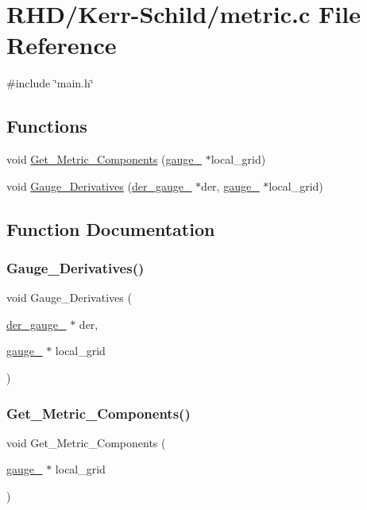 \hypertarget{Kerr-Schild_2metric_8c}{}\section{R\+H\+D/\+Kerr-\/\+Schild/metric.c File Reference}
\label{Kerr-Schild_2metric_8c}
{\ttfamily \#include \char`\"{}main.\+h\char`\"{}}\newline
\subsection*{Functions}
\begin{DoxyCompactItemize}
\item 
void \hyperlink{Kerr-Schild_2metric_8c_a18642caac9855aeac797fbaba90b64d1}{Get\+\_\+\+Metric\+\_\+\+Components} (\hyperlink{structgauge__}{gauge\+\_\+} $\ast$local\+\_\+grid)
\item 
void \hyperlink{Kerr-Schild_2metric_8c_afd567a147123bb7e7618da4b0263fefe}{Gauge\+\_\+\+Derivatives} (\hyperlink{structder__gauge__}{der\+\_\+gauge\+\_\+} $\ast$der, \hyperlink{structgauge__}{gauge\+\_\+} $\ast$local\+\_\+grid)
\end{DoxyCompactItemize}


\subsection{Function Documentation}
\mbox{\label{Kerr-Schild_2metric_8c_afd567a147123bb7e7618da4b0263fefe}} 
\subsubsection{\texorpdfstring{Gauge\+\_\+\+Derivatives()}{Gauge\_Derivatives()}}
{\footnotesize\ttfamily void Gauge\+\_\+\+Derivatives (\begin{DoxyParamCaption}\item[{\hyperlink{structder__gauge__}{der\+\_\+gauge\+\_\+} $\ast$}]{der,  }\item[{\hyperlink{structgauge__}{gauge\+\_\+} $\ast$}]{local\+\_\+grid }\end{DoxyParamCaption})}

\mbox{\label{Kerr-Schild_2metric_8c_a18642caac9855aeac797fbaba90b64d1}} 
\subsubsection{\texorpdfstring{Get\+\_\+\+Metric\+\_\+\+Components()}{Get\_Metric\_Components()}}
{\footnotesize\ttfamily void Get\+\_\+\+Metric\+\_\+\+Components (\begin{DoxyParamCaption}\item[{\hyperlink{structgauge__}{gauge\+\_\+} $\ast$}]{local\+\_\+grid }\end{DoxyParamCaption})}

